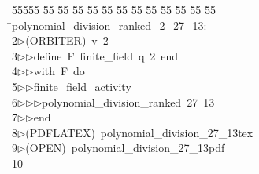 %
%
\begin{tabbing}
55555 \= 55 \= 55 \= 55 \= 55 \= 55 \= 55 \= 55 \= 55 \= 55 \= 55 \= 55 \= 55 \= \>polynomial\_division\_ranked\_2\_27\_13:\\[0pt]
2\>$\triangleright$\>(ORBITER)\ v\ 2\ \\[0pt]
3\>$\triangleright$\>$\triangleright$\>define\ F\ finite\_field\ q\ 2\ end\ \\[0pt]
4\>$\triangleright$\>$\triangleright$\>with\ F\ do\ \\[0pt]
5\>$\triangleright$\>$\triangleright$\>finite\_field\_activity\ \\[0pt]
6\>$\triangleright$\>$\triangleright$\>$\triangleright$\>polynomial\_division\_ranked\ 27\ 13\ \\[0pt]
7\>$\triangleright$\>$\triangleright$\>end\\[0pt]
8\>$\triangleright$\>(PDFLATEX)\ polynomial\_division\_27\_13tex\\[0pt]
9\>$\triangleright$\>(OPEN)\ polynomial\_division\_27\_13pdf\\[0pt]
10\>\end{tabbing}

